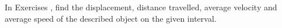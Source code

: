 {\noindent In Exercises}
{ , find the displacement, distance travelled, average velocity and average speed of the described object on the given interval.
}
